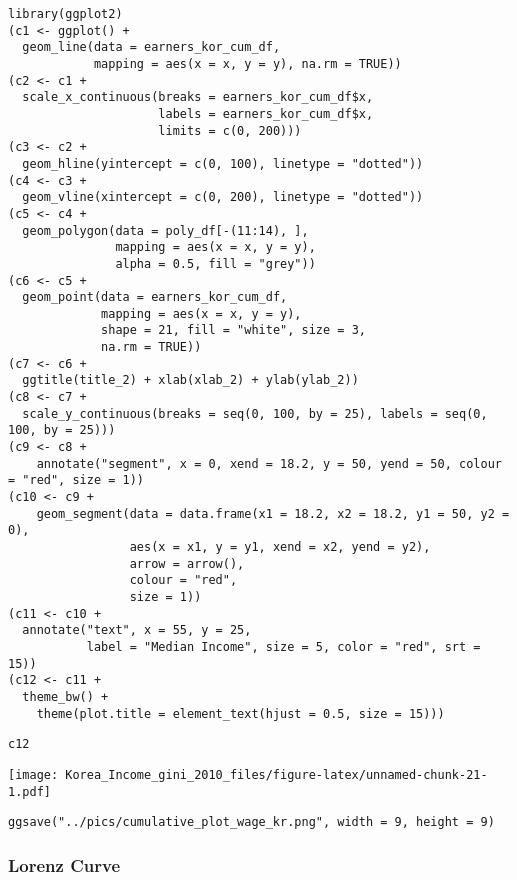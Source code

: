 \documentclass[
]{article}
\begin{document}
\begin{verbatim}
library(ggplot2)
(c1 <- ggplot() +
  geom_line(data = earners_kor_cum_df, 
            mapping = aes(x = x, y = y), na.rm = TRUE))
(c2 <- c1 +
  scale_x_continuous(breaks = earners_kor_cum_df$x,
                     labels = earners_kor_cum_df$x,
                     limits = c(0, 200)))
(c3 <- c2 +
  geom_hline(yintercept = c(0, 100), linetype = "dotted")) 
(c4 <- c3 +
  geom_vline(xintercept = c(0, 200), linetype = "dotted")) 
(c5 <- c4 + 
  geom_polygon(data = poly_df[-(11:14), ], 
               mapping = aes(x = x, y = y), 
               alpha = 0.5, fill = "grey")) 
(c6 <- c5 +
  geom_point(data = earners_kor_cum_df, 
             mapping = aes(x = x, y = y), 
             shape = 21, fill = "white", size = 3,
             na.rm = TRUE)) 
(c7 <- c6 +
  ggtitle(title_2) + xlab(xlab_2) + ylab(ylab_2)) 
(c8 <- c7 +
  scale_y_continuous(breaks = seq(0, 100, by = 25), labels = seq(0, 100, by = 25)))
(c9 <- c8 +
    annotate("segment", x = 0, xend = 18.2, y = 50, yend = 50, colour = "red", size = 1))
(c10 <- c9 +
    geom_segment(data = data.frame(x1 = 18.2, x2 = 18.2, y1 = 50, y2 = 0),
                 aes(x = x1, y = y1, xend = x2, yend = y2), 
                 arrow = arrow(),
                 colour = "red",
                 size = 1))
(c11 <- c10 +
  annotate("text", x = 55, y = 25, 
           label = "Median Income", size = 5, color = "red", srt = 15)) 
(c12 <- c11 +
  theme_bw() +
    theme(plot.title = element_text(hjust = 0.5, size = 15)))
\end{verbatim}

\begin{verbatim}
c12
\end{verbatim}

\texttt{[image: Korea\_Income\_gini\_2010\_files/figure-latex/unnamed-chunk-21-1.pdf]}

\begin{verbatim}
ggsave("../pics/cumulative_plot_wage_kr.png", width = 9, height = 9)
\end{verbatim}

\hypertarget{lorenz-curve-1}{%
\subsubsection{Lorenz Curve}\label{lorenz-curve-1}}
\end{document}
